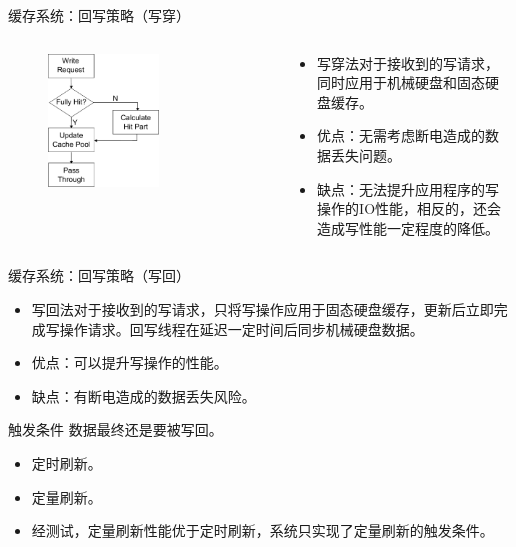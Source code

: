 \documentclass[compress]{beamer}
\begin{document}
\begin{frame}{缓存系统：回写策略（写穿）}
    \begin{columns}
    \begin{column}{0.5\textwidth}
        \begin{figure}
        \includegraphics[width=0.6\textwidth]{../graph/write-through}
        \end{figure}
    \end{column}
    \begin{column}{0.5\textwidth}
        \begin{itemize}
        \item 写穿法对于接收到的写请求，同时应用于机械硬盘和固态硬盘缓存。
        \item 优点：无需考虑断电造成的数据丢失问题。
        \item 缺点：无法提升应用程序的写操作的IO性能，相反的，还会造成写性能一定程度的降低。
        \end{itemize}
    \end{column}
    \end{columns}
\end{frame}

\begin{frame}{缓存系统：回写策略（写回）}
\begin{itemize}
\item 写回法对于接收到的写请求，只将写操作应用于固态硬盘缓存，更新后立即完成写操作请求。回写线程在延迟一定时间后同步机械硬盘数据。
\item 优点：可以提升写操作的性能。
\item 缺点：有断电造成的数据丢失风险。
\end{itemize}

\begin{block}{触发条件}
数据最终还是要被写回。
\begin{itemize}
\item 定时刷新。
\item 定量刷新。
\item 经测试，定量刷新性能优于定时刷新，系统只实现了定量刷新的触发条件。
\end{itemize}
\end{block}
\end{frame}
\end{document}
